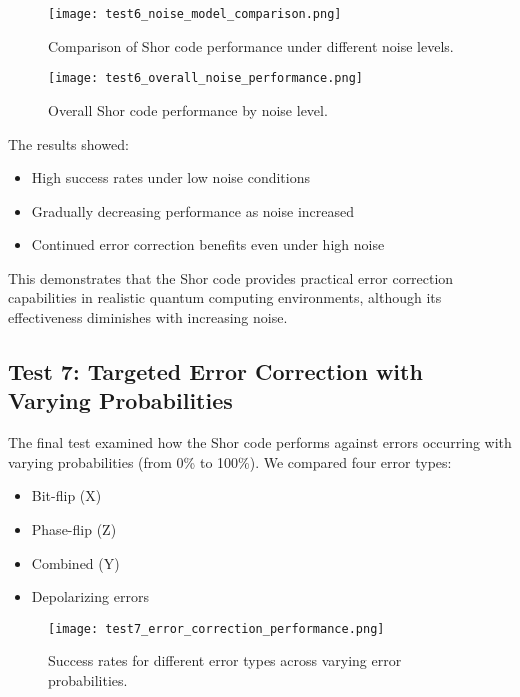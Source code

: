 \documentclass[12pt,a4paper]{article}
\begin{document}
\begin{figure}[H]
    \centering
    \texttt{[image: test6\_noise\_model\_comparison.png]}
    \caption{Comparison of Shor code performance under different noise levels.}
    \label{fig:noise_model_comparison}
\end{figure}

\begin{figure}[H]
    \centering
    \texttt{[image: test6\_overall\_noise\_performance.png]}
    \caption{Overall Shor code performance by noise level.}
    \label{fig:overall_noise_performance}
\end{figure}

The results showed:
\begin{itemize}
    \item High success rates under low noise conditions
    \item Gradually decreasing performance as noise increased
    \item Continued error correction benefits even under high noise
\end{itemize}

This demonstrates that the Shor code provides practical error correction capabilities in realistic quantum computing environments, although its effectiveness diminishes with increasing noise.

\subsection{Test 7: Targeted Error Correction with Varying Probabilities}

The final test examined how the Shor code performs against errors occurring with varying probabilities (from 0\% to 100\%). We compared four error types:
\begin{itemize}
    \item Bit-flip (X)
    \item Phase-flip (Z)
    \item Combined (Y)
    \item Depolarizing errors
\end{itemize}

\begin{figure}[H]
    \centering
    \texttt{[image: test7\_error\_correction\_performance.png]}
    \caption{Success rates for different error types across varying error probabilities.}
    \label{fig:error_correction_performance}
\end{figure}
\end{document}
